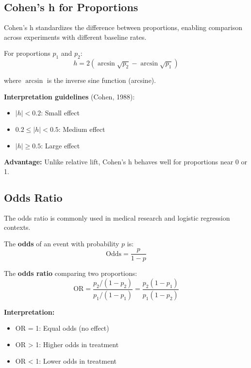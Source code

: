 \subsection{Cohen's h for Proportions}

Cohen's h standardizes the difference between proportions, enabling comparison across experiments with different baseline rates.

\begin{definition}[Cohen's h]
For proportions $p_1$ and $p_2$:
\begin{equation}
h = 2(\arcsin\sqrt{p_2} - \arcsin\sqrt{p_1})
\end{equation}

where $\arcsin$ is the inverse sine function (arcsine).
\end{definition}

\textbf{Interpretation guidelines} (Cohen, 1988):
\begin{itemize}
    \item $|h| < 0.2$: Small effect
    \item $0.2 \leq |h| < 0.5$: Medium effect
    \item $|h| \geq 0.5$: Large effect
\end{itemize}

\textbf{Advantage:} Unlike relative lift, Cohen's h behaves well for proportions near 0 or 1.

\subsection{Odds Ratio}

The odds ratio is commonly used in medical research and logistic regression contexts.

\begin{definition}
The \textbf{odds} of an event with probability $p$ is:
\begin{equation}
\text{Odds} = \frac{p}{1-p}
\end{equation}

The \textbf{odds ratio} comparing two proportions:
\begin{equation}
\text{OR} = \frac{p_2/(1-p_2)}{p_1/(1-p_1)} = \frac{p_2(1-p_1)}{p_1(1-p_2)}
\end{equation}
\end{definition}

\textbf{Interpretation:}
\begin{itemize}
    \item OR = 1: Equal odds (no effect)
    \item OR > 1: Higher odds in treatment
    \item OR < 1: Lower odds in treatment
\end{itemize}

